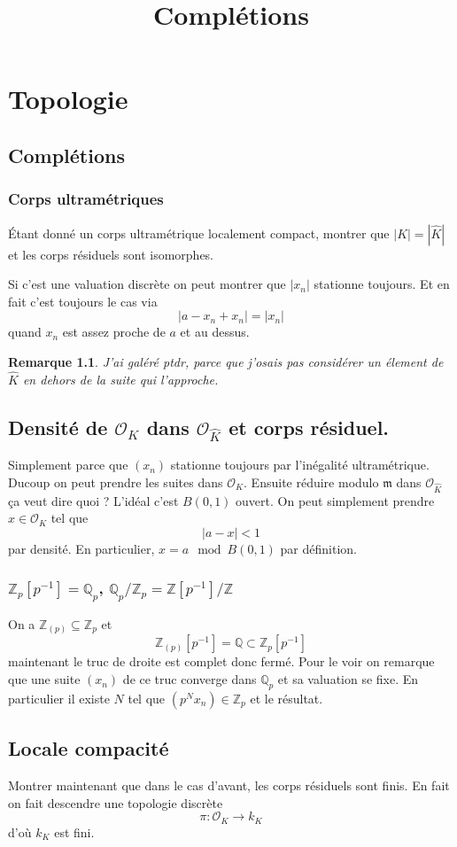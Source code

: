 \documentclass[a4paper,12pt]{book}
\title{Complétions}
\date{}
\newcommand{\Z}{\mathbb{Z}}
\newcommand{\Q}{\mathbb{Q}}
\newcommand{\Or}{\mathcal{O}}
\newcommand{\m}{\mathfrak m}
\theoremstyle{plain}
\newtheorem{rem}{Remarque}
\theoremstyle{definition}
\theoremstyle{remark}
\begin{document}
\maketitle

\chapter{Topologie}
\section{Complétions}
\subsection{Corps ultramétriques}
Étant donné un corps ultramétrique localement compact, montrer
que $|K|=|\hat K|$ et les corps résiduels sont isomorphes.

Si c'est une valuation discrète on peut montrer que $|x_n|$ 
stationne toujours. Et en fait c'est toujours le cas via
\[|a-x_n+x_n|=|x_n|\]
quand $x_n$ est assez proche de $a$ et au dessus. 
\begin{rem}
    J'ai galéré ptdr, parce que j'osais pas considérer un élement
    de $\hat K$ en dehors de la suite qui l'approche.
\end{rem}

\section{Densité de $\Or_K$ dans $\Or_{\hat K}$ et corps résiduel.}
Simplement parce que $(x_n)$ stationne toujours par
l'inégalité ultramétrique. Ducoup on peut prendre les suites
dans $\Or_K$. Ensuite réduire modulo $\m$ dans $\Or_{\hat K}$
ça veut dire quoi ? L'idéal c'est $B(0,1)$ ouvert. On peut
simplement prendre $x\in \Or_K$ tel que 
\[|a-x|<1\]
par densité. En particulier, $x=a\mod B(0,1)$ par définition.

\subsection{$\Z_p[p^{-1}]=\Q_p$, $\Q_p/\Z_p=\Z[p^{-1}]/\Z$}
On a $\Z_{(p)}\subseteq \Z_p$ et 
\[\Z_{(p)}[p^{-1}]=\Q\subset \Z_p[p^{-1}]\]
maintenant le truc de droite est complet donc fermé. Pour le voir
on remarque que une suite $(x_n)$ de ce truc converge dans $\Q_p$
et sa valuation se fixe. En particulier il existe $N$ tel que 
$(p^Nx_n)\in \Z_p$ et le résultat.
\section{Locale compacité}
Montrer maintenant que dans le cas d'avant, les corps résiduels 
sont finis. En fait on fait descendre une topologie discrète
\[\pi \colon \Or_K\to k_K\]
d'où $k_K$ est fini.


\section{}
\end{document}
